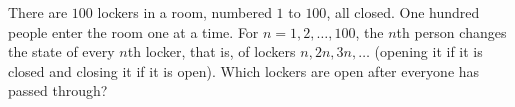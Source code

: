 There are $100$ lockers in a room, numbered $1$ to $100$, all closed. One hundred people enter the room one at a time. For $n=1,2,\dots,100$, the $n$th person changes the state of every $n$th locker, that is, of lockers $n,2n,3n,\dots$ (opening it if it is closed and closing it if it is open). Which lockers are open after everyone has passed through?

